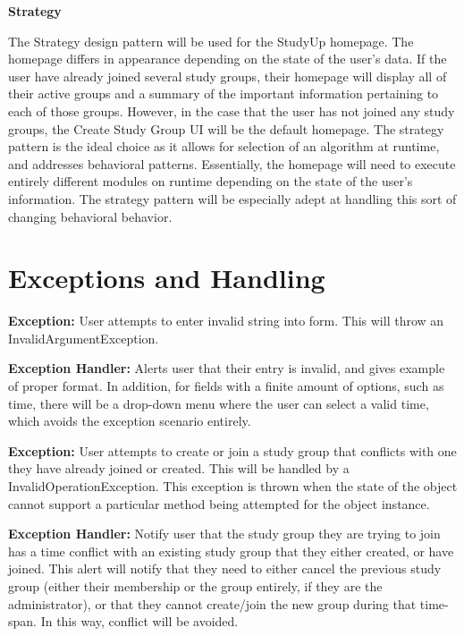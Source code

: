 \documentclass[12pt,letterpaper]{article}
\begin{document}
\textbf{Strategy}

The Strategy design pattern will be used for the StudyUp homepage. The homepage differs in appearance depending on the state of the user's data. If the user have already joined several study groups, their homepage will display all of their active groups and a summary of the important information pertaining to each of those groups. However, in the case that the user has not joined any study groups, the Create Study Group UI will be the default homepage. The strategy pattern is the ideal choice as it allows for selection of an algorithm at runtime, and addresses behavioral patterns. Essentially, the homepage will need to execute entirely different modules on runtime depending on the state of the user's information. The strategy pattern will be especially adept at handling this sort of changing behavioral behavior. 

\clearpage
\section{Exceptions and Handling} %
\textbf{Exception:} User attempts to enter invalid string into form. This will throw an InvalidArgumentException. 

\textbf{Exception Handler:} Alerts user that their entry is invalid, and gives example of proper format. In addition, for fields with a finite amount of options, such as time, there will be a drop-down menu where the user can select a valid time, which avoids the exception scenario entirely. 

\textbf{Exception:} User attempts to create or join a study group that conflicts with one they have already joined or created. This will be handled by a InvalidOperationException. This exception is thrown when the state of the object cannot support a particular method being attempted for the object instance.

\textbf{Exception Handler:} Notify user that the study group they are trying to join has a time conflict with an existing study group that they either created, or have joined. This alert will notify that they need to either cancel the previous study group (either their membership or the group entirely, if they are the administrator), or that they cannot create/join the new group during that time-span. In this way, conflict will be avoided.
\end{document}
